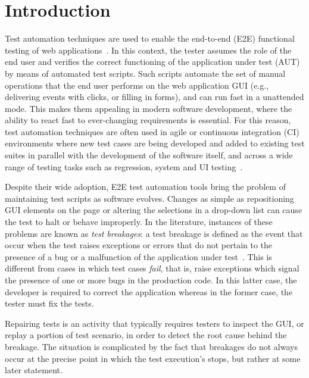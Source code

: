 \section{Introduction}\label{sec:introduction}

Test automation techniques are used to enable the end-to-end (E2E) functional testing of web applications~\cite{DBLP:journals/ac/TonellaRM14}. 
In this context, the tester assumes the role of the end user and verifies the correct functioning of the application under test (AUT) by means of automated test scripts. Such scripts automate the set of manual operations that the end user performs on the web application GUI (e.g., delivering events with clicks, or filling in forms), and can run fast in a unattended mode. This makes them appealing in modern software development, where the ability to react fast to ever-changing requirements is essential. For this reason, test automation techniques are often used in agile or continuous integration (CI) environments where new test cases are being developed and added to existing test suites in parallel with the development of the software itself, and across a wide range of testing tasks such as regression, system and UI testing~\cite{STVR:STVR121,Fewster,Ramler:2006:EPT:1138929.1138946,Nguyen2014,7381848}.


Despite their wide adoption, E2E test automation tools bring the problem of maintaining test scripts as software evolves. Changes as simple as repositioning GUI elements on the page or altering the selections in a drop-down list can cause the test to halt or behave improperly. 
In the literature, instances of these problems are known as \textit{test breakages}: a test breakage is defined as the event that occur when the test raises exceptions or errors that do not pertain to the presence of a bug or a malfunction of the application under test~\cite{Daniel:2011:AGR:2002931.2002937,Daniel:2009:RSR:1747491.1747538,Daniel:2010:TRU:1831708.1831734,Hammoudi-2016-ICST}. 
This is different from cases in which test cases \textit{fail}, that is, raise exceptions which signal the presence of one or more bugs in the production code. In this latter case, the developer is required to correct the application whereas in the former case, the tester must fix the tests. %


Repairing tests is an activity that typically requires testers to inspect the GUI, or replay a portion of test scenario, in order to detect the root cause behind the breakage. The situation is complicated by the fact that breakages do not always occur at the precise point in which the test execution's stops, but rather at some later statement.

